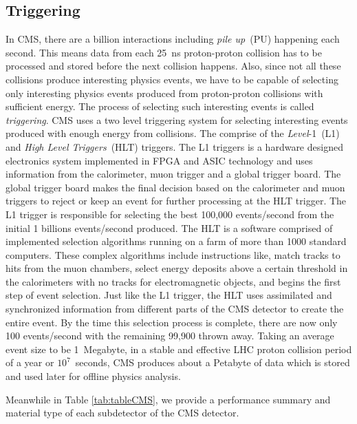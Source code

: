 \subsection{Triggering}
In CMS, there are a billion interactions including \textit{pile up}~(PU) happening each second. This means data from each 25~ns proton-proton collision has to be processed and stored before the next collision happens. Also, since not all these collisions produce 
interesting physics events, we have to be capable of selecting only interesting physics events produced from proton-proton collisions with sufficient  energy. The process of selecting such interesting events is called \textit{triggering}.
CMS uses a two level triggering system for selecting interesting events produced with enough energy from collisions.
The comprise of the \textit{Level}-1~(L1) and \textit{High Level Triggers}~(HLT) triggers.
\newline
The L1 triggers is a hardware designed electronics system implemented in FPGA and ASIC technology and uses information from the calorimeter, muon trigger and a global trigger board. The global trigger board makes the final decision based on the calorimeter and muon triggers to reject or keep an event for further processing at the HLT trigger. The L1 trigger is responsible for selecting the best 100,000 events/second from the initial 1 billions events/second produced. %
\newline
The HLT is a software comprised of implemented selection algorithms running on a farm of more than 1000 standard computers. %
These complex algorithms include instructions like, match tracks to hits from the muon chambers, select energy deposits above a certain threshold in the calorimeters with no tracks for electromagnetic objects, and begins the first step of event selection. Just like the L1 trigger, the HLT  uses assimilated and synchronized information from different parts of the CMS detector to create the entire event. 
By the time this selection process is complete, there are now only 100 events/second with the remaining 99,900 thrown away.
Taking an average event size to be 1~Megabyte, in a stable and effective LHC proton collision period of a year or $10^{7}$~seconds, CMS produces about a Petabyte of data which is stored and used later for offline physics analysis.
\par
Meanwhile in Table \ref{tab:tableCMS}, we provide a performance summary and  material type of each subdetector of the CMS detector.

